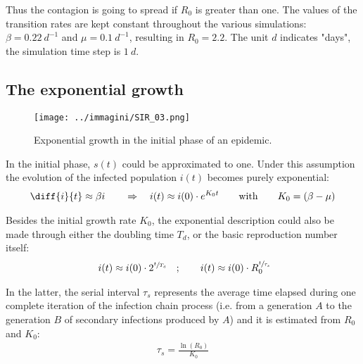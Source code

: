 \documentclass[DIV=12, BCOR=0pt]{scrartcl}  %
\begin{document}
  Thus the contagion is going to spread if $R_{0}$ is greater than one. The values of the transition rates are kept constant throughout the various simulations: $\beta = 0.22 \ d^{-1}$ and $\mu = 0.1 \ d^{-1}$, resulting in $R_{0} = 2.2$. The unit $d$ indicates "days", the simulation time step is $1 \ d$.
  
  
  
  
  
  \subsection{The exponential growth}
  
  \begin{figure}[h!]
  	\centering
  	\texttt{[image: ../immagini/SIR\_03.png]}
  	\caption{Exponential growth in the initial phase of an epidemic. }
  	\label{fig:SIRexp}
  \end{figure}
  
  In the initial phase, $s(t)$ could be approximated to one. %
  Under this assumption the evolution of the infected population $i(t)$ becomes purely exponential:
  \begin{align}
  	\diff{i}{t} \approx  \beta i \qquad \Rightarrow \quad 	i(t) \approx i(0) \cdot e^{K_{0} t} \qquad \mathrm{with} \qquad K_{0} = (\beta - \mu)
  \end{align}
	
	Besides the initial growth rate $K_{0}$, the exponential description could also be made through either the doubling time $T_{d}$, or the basic reproduction number itself:
	\begin{align}
		\ i(t) \approx i(0) \cdot 2^{\sfrac{t}{T_{d}}} \quad ; \qquad i(t) \approx i(0) \cdot R_{0}^{\sfrac{t}{\tau_{s}}}
	\end{align}
	
	In the latter, the serial interval $\tau_{s}$ represents the average time elapsed during one complete iteration of the infection chain process (i.e. from a generation $A$ to the generation $B$ of secondary infections produced by $A$) and it is estimated from $R_{0}$ and $K_{0}$: 
	\begin{align}
		\tau_{s} = \frac{\ln(R_{0})}{K_{0}}
	\end{align}
\end{document}
